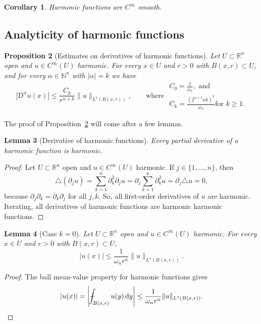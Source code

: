\documentclass[a4paper,9pt]{amsart}
\newcommand{\N}{\mathbb{N}}	%
\newcommand{\R}{\mathbb{R}}	%
\newcommand{\did}{\,\mathrm{d}}	%
\newcommand{\de}{\partial}		%
\newcommand{\Diff}{\mathrm{D}}
\newcommand{\laplacian}{\triangle}
\def\Xint#1{\mathchoice
      {\XXint\displaystyle\textstyle{#1}}%
      {\XXint\textstyle\scriptstyle{#1}}%
      {\XXint\scriptstyle\scriptscriptstyle{#1}}%
      {\XXint\scriptscriptstyle\scriptscriptstyle{#1}}%
      \!\int}
\def\XXint#1#2#3{{\setbox0=\hbox{$#1{#2#3}{\int}$}
        \vcenter{\hbox{$#2#3$}}\kern-.5\wd0}}
\def\fint{\Xint-}
\theoremstyle{plain}
\newtheorem{proposition}{Proposition}[section]
\newtheorem{lemma}[proposition]{Lemma}
\newtheorem{corollary}[proposition]{Corollary}
\theoremstyle{definition}
\theoremstyle{remark}
\begin{document}
\begin{corollary}
	Harmonic functions are $C^\infty$ smooth.
\end{corollary}

\subsection{Analyticity of harmonic functions}\label{subs67baeff5}

\begin{proposition}[Estimates on derivatives of harmonic functions]\label{prop67bb09b8}
	Let $U\subset\R^n$ open and $u\in C^\infty(U)$ harmonic.
	For every $ x\in U$ and $r>0$ with $B( x,r)\subset U$,
	and for every $\alpha\in\N^n$ with $|\alpha|=k$ we have
	\begin{equation}\label{eq67baf145}
		 |\Diff^\alpha u( x)| \le \frac{C_k}{r^{n+k}} \|u\|_{L^1(B(x,r))} ,
		 \qquad\text{where }
		 \begin{array}{l}
		 C_0 = \frac1{\omega_n } , \text{ and }\\
		 C_k = \frac{(2^{n+1}n k)^k}{\omega_n } \text{for }k\ge1 .
		 \end{array}
	\end{equation}
\end{proposition}

The proof of Proposition~\ref{prop67bb09b8} will come after a few lemmas.

\begin{lemma}[Derivative of harmonic functions]\label{lem67bb0a0c}
	Every partial derivative of a harmonic function is harmonic.
\end{lemma}
\begin{proof}
	Let $U\subset\R^n$ open and $u\in C^\infty(U)$ harmonic.
	If $j\in\{1,\dots,n\}$, then 
	\[
	\laplacian(\de_ju) = \sum_{k=1}^n \de_k^2\de_ju = \de_j\sum_{k=1}^n \de_k^2u 
	= \de_j\laplacian u = 0 ,
	\]
	because $\de_j\de_k=\de_k\de_j$ for all $j,k$.
	So, all first-order derivatives of $u$ are harmonic.
	Iterating, all derivatives of harmonic functions are harmonic harmonic functions.
\end{proof}

\begin{lemma}[Case $k=0$]\label{lem67bb11e4}
	Let $U\subset\R^n$ open and $u\in C^\infty(U)$ harmonic.
	For every $ x\in U$ and $r>0$ with $B( x,r)\subset U$,
	\begin{equation}\label{eq67bb11da}
		 |u(x)| \le \frac1{\omega_n r^n}  \|u\|_{L^1(B(x,r))} .
	\end{equation}
\end{lemma}
\begin{proof}
	The ball mean-value property for harmonic functions gives
	\[
	|u(x)| 
	= \left| \fint_{B(x,r)} u(y) \did y \right|
	\le \frac1{\omega_n r^n}  \|u\|_{L^1(B(x,r))} .
	\]
\end{proof}
\end{document}
